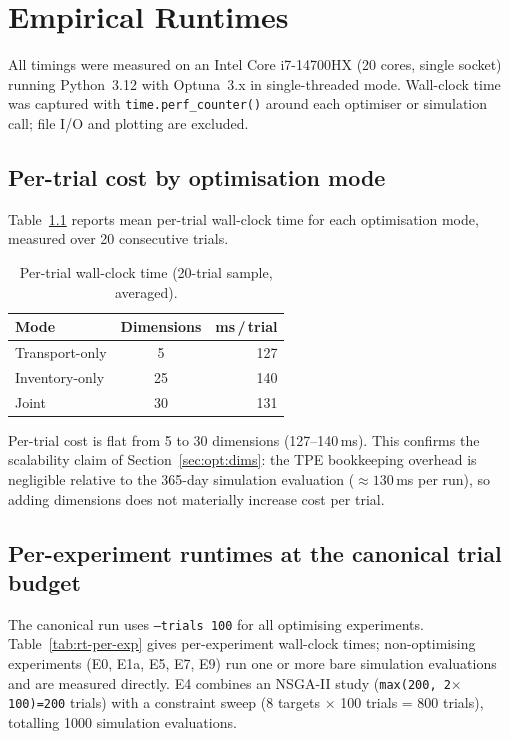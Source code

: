 \chapter{Empirical Runtimes}
\label{appn:runtimes}

All timings were measured on an Intel Core i7-14700HX (20 cores,
single socket) running Python~3.12 with Optuna~3.x in single-threaded
mode.  Wall-clock time was captured with \texttt{time.perf\_counter()}
around each optimiser or simulation call; file I/O and plotting are
excluded.

\section*{Per-trial cost by optimisation mode}

Table~\ref{tab:rt-per-trial} reports mean per-trial wall-clock time
for each optimisation mode, measured over 20 consecutive trials.

\begin{table}[H]
  \centering
  \caption{Per-trial wall-clock time (20-trial sample, averaged).}
  \label{tab:rt-per-trial}
  \begin{tabular}{@{}lcr@{}}
    \toprule
    Mode & Dimensions & ms\,/\,trial \\
    \midrule
    Transport-only & 5  & 127 \\
    Inventory-only & 25 & 140 \\
    Joint          & 30 & 131 \\
    \bottomrule
  \end{tabular}
\end{table}

Per-trial cost is flat from 5 to 30 dimensions (127--140\,ms).  This
confirms the scalability claim of Section~\ref{sec:opt:dims}: the TPE
bookkeeping overhead is negligible relative to the 365-day simulation
evaluation ($\approx130$\,ms per run), so adding dimensions does not
materially increase cost per trial.

\section*{Per-experiment runtimes at the canonical trial budget}

The canonical run uses \texttt{--trials 100} for all optimising
experiments.  Table~\ref{tab:rt-per-exp} gives per-experiment
wall-clock times; non-optimising experiments (E0, E1a, E5, E7, E9)
run one or more bare simulation evaluations and are measured directly.
E4 combines an NSGA-II study (\texttt{max(200,\,2$\times$100)=200}
trials) with a constraint sweep (8 targets $\times$ 100 trials = 800
trials), totalling 1000 simulation evaluations.

